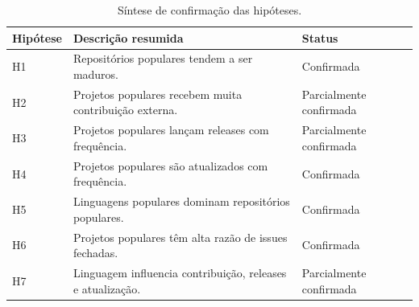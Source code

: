 \documentclass[10pt,a4paper,twocolumn]{article}
\begin{document}
\begin{table}[H]
  \centering
  \caption{Síntese de confirmação das hipóteses.}
  \label{tab:hipoteses}
  \small
  \begin{tabularx}{\textwidth}{lXl}
    Hipótese & Descrição resumida & Status \\
    \midrule
    H1 & Repositórios populares tendem a ser maduros. & Confirmada \\
    H2 & Projetos populares recebem muita contribuição externa. & Parcialmente confirmada \\
    H3 & Projetos populares lançam releases com frequência. & Parcialmente confirmada \\
    H4 & Projetos populares são atualizados com frequência. & Confirmada \\
    H5 & Linguagens populares dominam repositórios populares. & Confirmada \\
    H6 & Projetos populares têm alta razão de issues fechadas. & Confirmada \\
    H7 & Linguagem influencia contribuição, releases e atualização. & Parcialmente confirmada \\
    \bottomrule
  \end{tabularx}
\end{table}

\clearpage
\end{document}
